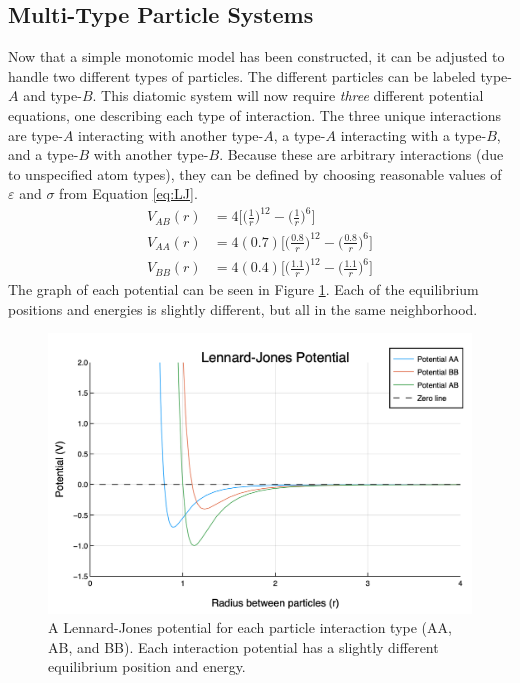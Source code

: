 \subsection{Multi-Type Particle Systems}\label{Sect:diatomic}
\par Now that a simple monotomic model has been constructed, it can be adjusted to handle two different types of particles. The different particles can be labeled type-$A$ and type-$B$. This diatomic system will now require \textit{three} different potential equations, one describing each type of interaction. The three unique interactions are type-$A$ interacting with another type-$A$, a type-$A$ interacting with a type-$B$, and a type-$B$ with another type-$B$. Because these are arbitrary interactions (due to unspecified atom types), they can be defined by choosing reasonable values of $\varepsilon$ and $\sigma$ from Equation \ref{eq:LJ}. 
\begin{align}
V_{AB}(r) &= 4 \bigg[\Big(\frac{1}{r}\Big)^{12} - \Big(\frac{1}{r}\Big)^6\bigg] \label{LJ} \\
V_{AA}(r) &= 4 (0.7) \bigg[\Big(\frac{0.8}{r}\Big)^{12} - \Big(\frac{0.8}{r}\Big)^6\bigg] \label{LJ} \\
V_{BB}(r) &= 4 (0.4) \bigg[\Big(\frac{1.1}{r}\Big)^{12} - \Big(\frac{1.1}{r}\Big)^6\bigg] \label{LJ}
\end{align}
The graph of each potential can be seen in Figure \ref{fig:3LJ}. Each of the equilibrium positions and energies is slightly different, but all in the same neighborhood.

\begin{figure}[h]
\includegraphics[scale = 0.4]{Figures/newLJPotential}
\caption{A Lennard-Jones potential for each particle interaction type (AA, AB, and BB). Each interaction potential has a slightly different equilibrium position and energy. 
\label{fig:3LJ}} 
\end{figure}

